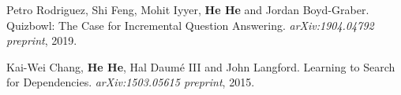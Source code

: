 Petro Rodriguez, Shi Feng, Mohit Iyyer, \textbf{He He} and Jordan Boyd-Graber. Quizbowl: The Case for Incremental Question Answering. \textit{arXiv:1904.04792 preprint}, 2019.

Kai-Wei Chang, \textbf{He He}, Hal Daum\'e III and John Langford. Learning to Search for Dependencies. \textit{arXiv:1503.05615 preprint}, 2015.

